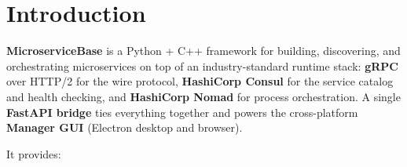%
%
%
%
%

\section{Introduction}

\textbf{MicroserviceBase} is a Python + C++ framework for building, discovering, and
orchestrating microservices on top of an industry-standard runtime stack: \textbf{gRPC}
over HTTP/2 for the wire protocol, \textbf{HashiCorp Consul} for the service catalog and
health checking, and \textbf{HashiCorp Nomad} for process orchestration.  A single
\textbf{FastAPI bridge} ties everything together and powers the cross-platform
\textbf{Manager GUI} (Electron desktop and browser).

It provides:


